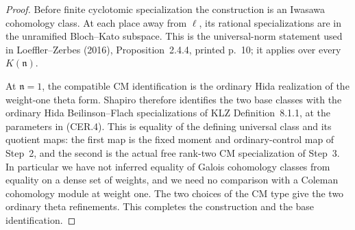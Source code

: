 \begin{proof}
Before finite cyclotomic specialization the construction is
an Iwasawa cohomology class.  At each place away from
$\ell$, its rational specializations are in the unramified
Bloch--Kato subspace.  This is the universal-norm statement
used in Loeffler--Zerbes (2016), Proposition~2.4.4, printed
p.~10; it applies over every $K(\mathfrak n)$.

At $\mathfrak n=1$, the compatible CM identification is
the ordinary Hida realization of the weight-one theta form.
Shapiro therefore identifies the two base classes with the
ordinary Hida Beilinson--Flach specializations of KLZ
Definition~8.1.1, at the parameters in (CER.4).
This is equality of the defining universal class and its
quotient maps: the first map is the fixed moment and
ordinary-control map of Step~2, and the second is the actual
free rank-two CM specialization of Step~3.  In particular
we have not inferred equality of Galois cohomology classes
from equality on a dense set of weights, and we need no
comparison with a Coleman cohomology module at weight one.
The two choices of the CM type give the two ordinary theta
refinements.  This completes the construction and the base
identification.
\end{proof}

